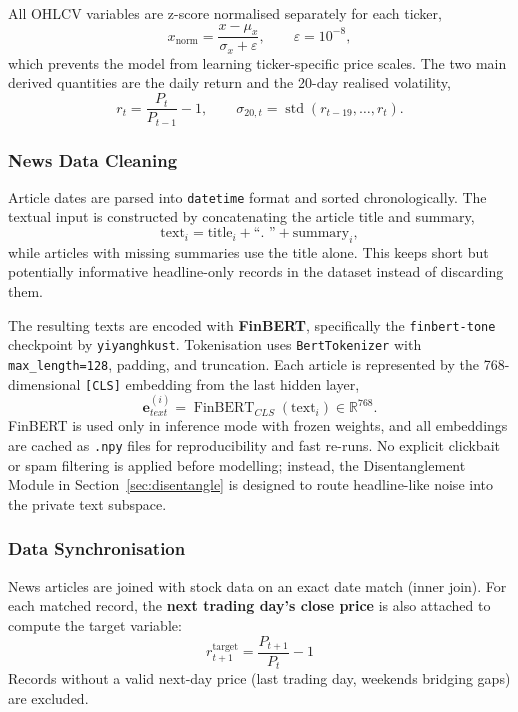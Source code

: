 \documentclass[12pt, a4paper]{article}
\begin{document}
All OHLCV variables are z-score normalised separately for each ticker,
\[
    x_{\text{norm}} = \frac{x - \mu_x}{\sigma_x + \varepsilon}, \qquad \varepsilon = 10^{-8},
\]
which prevents the model from learning ticker-specific price scales. The two main derived quantities are the daily return and the 20-day realised volatility,
\[
    r_t = \frac{P_t}{P_{t-1}} - 1, \qquad
    \sigma_{20,t}=\operatorname{std}(r_{t-19},\ldots,r_t).
\]

\subsubsection{News Data Cleaning}

Article dates are parsed into \texttt{datetime} format and sorted chronologically. The textual input is constructed by concatenating the article title and summary,
\[
    \text{text}_i = \text{title}_i + \text{``. ''} + \text{summary}_i,
\]
while articles with missing summaries use the title alone. This keeps short but potentially informative headline-only records in the dataset instead of discarding them.

The resulting texts are encoded with \textbf{FinBERT}, specifically the \texttt{finbert-tone} checkpoint by \texttt{yiyanghkust}. Tokenisation uses \texttt{BertTokenizer} with \texttt{max\_length=128}, padding, and truncation. Each article is represented by the 768-dimensional \texttt{[CLS]} embedding from the last hidden layer,
\[
    \mathbf{e}^{(i)}_{text} = \operatorname{FinBERT}_{CLS}(\text{text}_i) \in \mathbb{R}^{768}.
\]
FinBERT is used only in inference mode with frozen weights, and all embeddings are cached as \texttt{.npy} files for reproducibility and fast re-runs. No explicit clickbait or spam filtering is applied before modelling; instead, the Disentanglement Module in Section~\ref{sec:disentangle} is designed to route headline-like noise into the private text subspace.

\subsubsection{Data Synchronisation}

News articles are joined with stock data on an exact date match (inner join). For each matched record, the \textbf{next trading day's close price} is also attached to compute the target variable:
\[
    r_{t+1}^{\text{target}} = \frac{P_{t+1}}{P_t} - 1
\]
Records without a valid next-day price (last trading day, weekends bridging gaps) are excluded.
\end{document}

